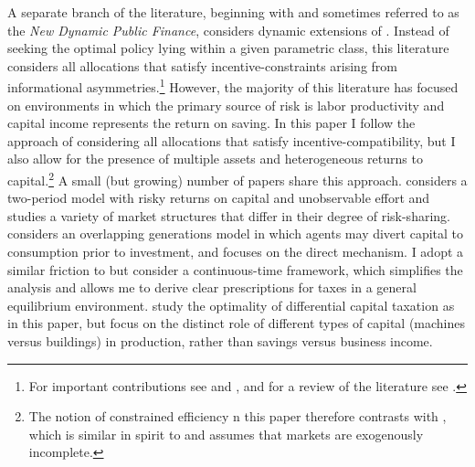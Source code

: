 \documentclass[11pt]{article}
\theoremstyle{plain}
\theoremstyle{definition} %
\begin{document}
A separate branch of the literature, beginning with \cite{golosov_optimal_2003} and sometimes referred to as the \textit{New Dynamic Public Finance}, considers dynamic extensions of \cite{mirrlees_exploration_1971}. Instead of seeking the optimal policy lying within a given parametric class, this literature considers all allocations that satisfy incentive-constraints arising from informational asymmetries.\footnote{For important contributions see \cite{farhi_insurance_2013} and \cite{golosov_redistribution_2016}, and for a review of the literature see \cite{golosov_policy_2015}.} However, the majority of this literature has focused on environments in which the primary source of risk is labor productivity and capital income represents the return on saving. In this paper I follow the approach of considering all allocations that satisfy incentive-compatibility, but I also allow for the presence of multiple assets and heterogeneous returns to capital.\footnote{The notion of constrained efficiency n this paper therefore contrasts with \cite{davila_constrained_2012}, which is similar in spirit to \cite{geanakoplos_existence_1985} and assumes that markets are exogenously incomplete.} A small (but growing) number of papers share this approach. \cite{albanesi_optimal_2006} considers a two-period model with risky returns on capital and unobservable effort and studies a variety of market structures that differ in their degree of risk-sharing. \cite{shourideh_optimal_2013} considers an overlapping generations model in which agents may divert capital to consumption prior to investment, and focuses on the direct mechanism. I adopt a similar friction to \cite{shourideh_optimal_2013} but consider a continuous-time framework, which simplifies the analysis and allows me to derive clear prescriptions for taxes in a general equilibrium environment. \cite{slavik_machines_2014} study the optimality of differential capital taxation as in this paper, but focus on the distinct role of different types of capital (machines versus buildings) in production, rather than savings versus business income. 
\end{document}
